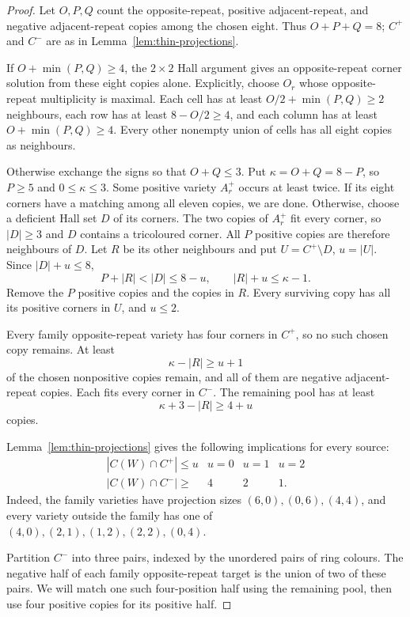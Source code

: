\begin{proof}
Let $O,P,Q$ count the opposite-repeat, positive
adjacent-repeat, and negative adjacent-repeat copies among the chosen eight.
Thus $O+P+Q=8$; $C^+$ and $C^-$ are as in Lemma~\ref{lem:thin-projections}.

If $O+\min(P,Q)\ge4$, the $2\times2$ Hall argument gives an
opposite-repeat corner solution from these eight copies alone. Explicitly,
choose $O_r$ whose opposite-repeat multiplicity is maximal. Each cell has
at least $O/2+\min(P,Q)\ge2$ neighbours, each row has at least
$8-O/2\ge4$, and each column has at least $O+\min(P,Q)\ge4$.
Every other nonempty union of cells has all eight copies as neighbours.

Otherwise exchange the signs so that $O+Q\le3$. Put
$\kappa=O+Q=8-P$, so $P\ge5$ and $0\le \kappa\le3$.
Some positive variety $A_r^+$ occurs at least twice. If its eight
corners have a matching among all eleven copies, we are done. Otherwise,
choose a deficient Hall set $D$ of its corners. The two copies of
$A_r^+$ fit every corner, so $|D|\ge3$ and $D$ contains a tricoloured
corner. All $P$ positive copies are therefore neighbours of $D$.
Let $R$ be its other neighbours and put $U=C^+\setminus D$, $u=|U|$.
Since $|D|+u\le8$,
\[
 P+|R|<|D|\le8-u,\qquad |R|+u\le \kappa-1.
\]
Remove the $P$ positive copies and the copies in $R$. Every surviving
copy has all its positive corners in $U$, and $u\le2$.

Every family opposite-repeat variety has four corners in $C^+$, so no
such chosen copy remains. At least
\[
 \kappa-|R|\ge u+1
\]
of the chosen nonpositive copies remain, and all of them are negative
adjacent-repeat copies. Each fits every corner in $C^-$. The remaining
pool has at least
\[
 \kappa+3-|R|\ge4+u
\]
copies.

Lemma~\ref{lem:thin-projections} gives the following implications for every source:
\[
\begin{array}{c|ccc}
 |C(W)\cap C^+|\le u &u=0&u=1&u=2\\\hline
 |C(W)\cap C^-|\ge&4&2&1.
\end{array}
\]
Indeed, the family varieties have projection sizes $(6,0),(0,6),(4,4)$,
and every variety outside the family has one of
$(4,0),(2,1),(1,2),(2,2),(0,4)$.

Partition $C^-$ into three pairs, indexed by the unordered pairs of ring
colours. The negative half of each family opposite-repeat target is the
union of two of these pairs. We will match one such four-position half
using the remaining pool, then use four positive copies for its positive
half.


\end{proof}

